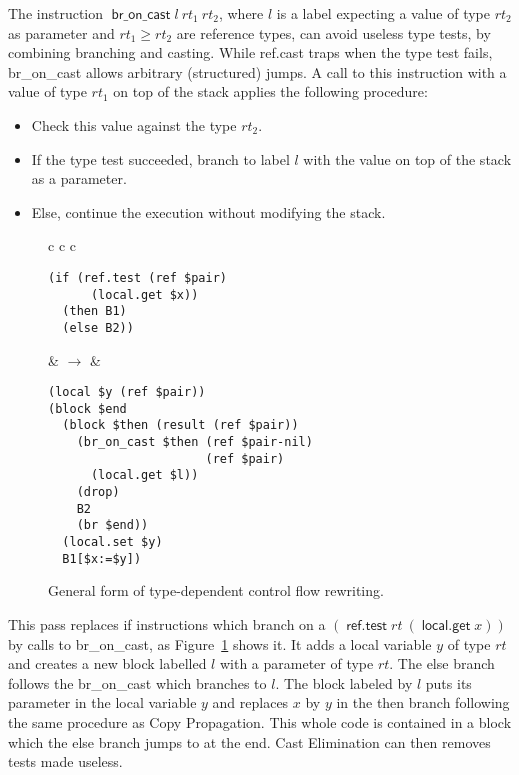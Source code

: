 \documentclass[a4paper,11pt]{article}
\DeclareMathOperator{\broncast}{\textsf{br\_on\_cast}}
\DeclareMathOperator{\reftest}{\textsf{ref.test}}
\DeclareMathOperator{\localget}{\textsf{local.get}}
\begin{document}
The instruction $\broncast l\ rt_1\ rt_2$, where $l$ is a label expecting a
value of type $rt_2$ as parameter and $rt_1\geq rt_2$ are reference types, can
avoid useless type tests, by combining branching and casting. While
\textsf{ref.cast} traps when the type test fails, \textsf{br\_on\_cast} allows
arbitrary (structured) jumps. A call to this instruction with a value of type
$rt_1$ on top of the stack applies the following procedure:
\begin{itemize}\setlength{\itemsep}{0pt}
  \item Check this value against the type $rt_2$.
  \item If the type test succeeded, branch to label $l$ with the value on top of
    the stack as a parameter.
  \item Else, continue the execution without modifying the stack.
\end{itemize}
\begin{figure}[h!]
  \centering
  \begin{tabular}{c c c}
    \begin{minipage}{\widthof{\texttt{(if (ref.test (ref \$pair)}}}
\begin{verbatim}
(if (ref.test (ref $pair)
      (local.get $x))
  (then B1)
  (else B2))
\end{verbatim}
\end{minipage}
    &
    $\rightarrow$
    &
\begin{minipage}{\widthof{\texttt{....(br\_on\_cast \$then (ref \$pair-nil)}}}
\begin{verbatim}
(local $y (ref $pair))
(block $end
  (block $then (result (ref $pair))
    (br_on_cast $then (ref $pair-nil)
                      (ref $pair)
      (local.get $l))
    (drop)
    B2
    (br $end))
  (local.set $y)
  B1[$x:=$y])
\end{verbatim}
\end{minipage}
  \end{tabular}
  \caption{General form of type-dependent control flow rewriting.}\label{br}
\end{figure}


This pass replaces \textsf{if} instructions which branch on a $(\reftest
rt\ (\localget x))$ by calls to \textsf{br\_on\_cast}, as Figure~\ref{br} shows
it. It adds a local variable $y$ of type $rt$ and creates a new block labelled
$l$ with a parameter of type $rt$. The else branch follows the
\textsf{br\_on\_cast} which branches to $l$. The block labeled by $l$ puts its
parameter in the local variable $y$ and replaces $x$ by $y$ in the then branch
following the same procedure as Copy Propagation. This whole code is contained
in a block which the else branch jumps to at the end. Cast Elimination can then
removes tests made useless.
\end{document}
